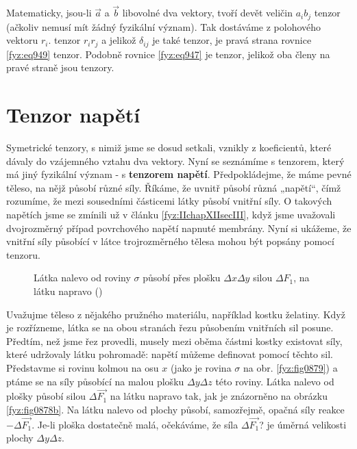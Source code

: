     Matematicky, jsou-li \(\vec{a}\) a \(\vec{b}\) libovolné dva vektory, tvoří devět veličin
    \(a_ib_j\) tenzor (ačkoliv nemusí mít žádný fyzikální význam). Tak dostáváme z polohového
    vektoru \(r_i\). tenzor \(r_ir_j\) a jelikož \(\delta_{ij}\) je také tenzor, je pravá strana
    rovnice \eqref{fyz:eq949} tenzor. Podobně rovnice \eqref{fyz:eq947} je tenzor, jelikož oba členy
    na pravé straně jsou tenzory.

  \section{Tenzor napětí}\label{fyz:IIchapXXXIsecVI} 

    Symetrické tenzory, s nimiž jsme se dosud setkali, vznikly z koeficientů, které dávaly do
    vzájemného vztahu dva vektory. Nyní se seznámíme s tenzorem, který má jiný fyzikální význam - s
    \textbf{tenzorem napětí}. Předpokládejme, že máme pevné těleso, na nějž působí různé síly.
    Říkáme, že uvnitř působí různá „napětí“, čímž rozumíme, že mezi sousedními částicemi látky
    působí vnitřní síly. O takových napětích jsme se zmínili už v článku \ref{fyz:IIchapXIIsecIII},
    když jsme uvažovali dvojrozměrný případ povrchového napětí napnuté membrány. Nyní si ukážeme, že
    vnitřní síly působící v látce trojrozměrného tělesa mohou být popsány pomocí tenzoru.

    \begin{figure}[ht!] %
      \centering
      \caption{Látka nalevo od roviny \(\sigma\) působí přes plošku \(\Delta x\Delta y\) silou
              \(\Delta F_1\), na látku napravo (\cite[s.~583]{Feynman02})}
      \label{fyz:fig0878}
    \end{figure}

    Uvažujme těleso z nějakého pružného materiálu, například kostku želatiny. Když je rozřízneme,
    látka se na obou stranách řezu působením vnitřních sil posune. Předtím, než jsme řez provedli,
    musely mezi oběma částmi kostky existovat síly, které udržovaly látku pohromadě: napětí můžeme
    definovat pomocí těchto sil. Představme si rovinu kolmou na osu \(x\) (jako je rovina \(\sigma\)
    na obr. \ref{fyz:fig0879}) a ptáme se na síly působící na malou plošku \(\Delta y\Delta z\) této
    roviny. Látka nalevo od plošky působí silou \(Δ\vec{F_1}\) na látku napravo tak, jak je
    znázorněno na obrázku \ref{fyz:fig0878b}. Na látku nalevo od plochy působí, samozřejmě, opačná
    síly reakce \(-Δ\vec{F_1}\). Je-li ploška dostatečně malá, očekáváme, že síla \(Δ\vec{F_1}\)? je
    úměrná velikosti plochy \(\Delta y\Delta z\).

